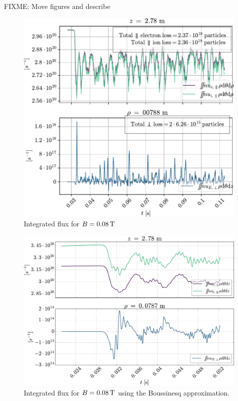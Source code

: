 FIXME: Move figures and describe
%
\begin{figure}[htb]
    \centering
    \includegraphics[width=1.00\textwidth]{fig/results/totalFlux/flux0008}
    \caption{Integrated flux for $B=0.08\, \text{T}$}
    \label{fig:flux0008}
\end{figure}
%
\begin{figure}[htb]
    \centering
    \includegraphics[width=1.00\textwidth]{fig/results/compareBouss/flux0008B}
    \caption{Integrated flux for $B=0.08\, \text{T}$ using the Boussinesq approximation.}
    \label{fig:fluxB0008}
\end{figure}

